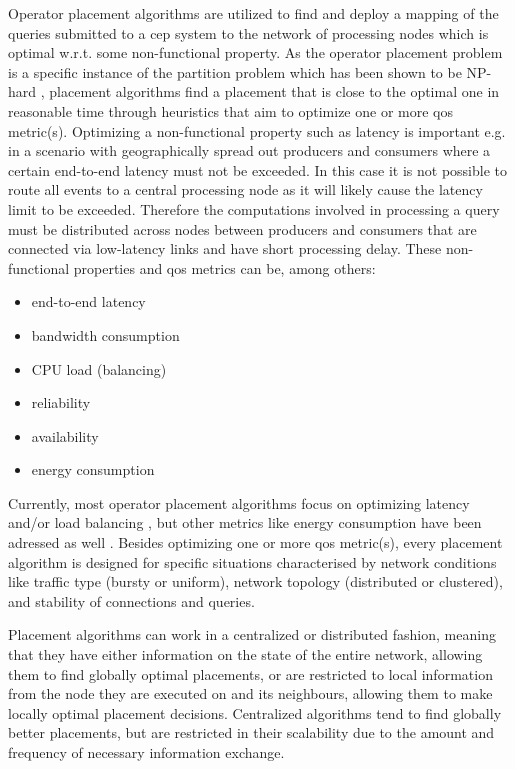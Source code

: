 Operator placement algorithms are utilized to find and deploy a mapping of the queries submitted to a \gls{cep} system to the network of processing nodes which is optimal w.r.t. some non-functional property.
As the operator placement problem is a specific instance of the partition problem which has been shown to be NP-hard \cite{Cardellini2016}, placement algorithms find a placement that is close to the optimal one in reasonable time through heuristics that aim to optimize one or more \gls{qos} metric(s).
Optimizing a non-functional property such as latency is important e.g. in a scenario with geographically spread out producers and consumers where a certain end-to-end latency must not be exceeded. In this case it is not possible to route all events to a central processing node as it will likely cause the latency limit to be exceeded. Therefore the computations involved in processing a query must be distributed across nodes between producers and consumers that are connected via low-latency links and have short processing delay.
These non-functional properties and \gls{qos} metrics can be, among others: 
\begin{itemize}
\item end-to-end latency 
\item bandwidth consumption
\item CPU load (balancing)
\item reliability
\item availability
\item energy consumption
\end{itemize}
Currently, most operator placement algorithms focus on optimizing latency \cite{} and/or load balancing \cite{}, but other metrics like energy consumption have been adressed as well \cite{}. 
Besides optimizing one or more \gls{qos} metric(s), every placement algorithm is designed for specific situations characterised by network conditions like traffic type (bursty or uniform), network topology (distributed or clustered), and stability of connections and queries. 

Placement algorithms can work in a centralized or distributed fashion, meaning that they have either information on the state of the entire network, allowing them to find globally optimal placements, or are restricted to local information from the node they are executed on and its neighbours, allowing them to make locally optimal placement decisions. Centralized algorithms tend to find globally better placements, but are restricted in their scalability due to the amount and frequency of necessary information exchange. 

